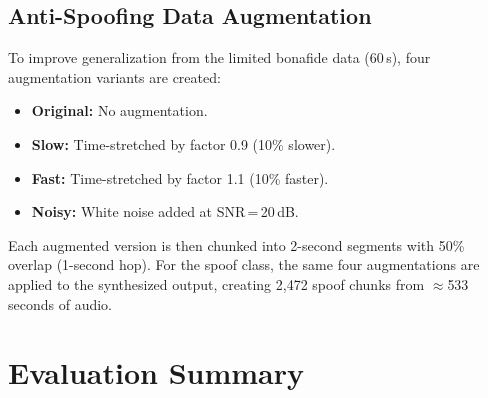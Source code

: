 \documentclass[11pt]{article}
\begin{document}
\subsection{Anti-Spoofing Data Augmentation}

To improve generalization from the limited bonafide data (60\,s), four
augmentation variants are created:
\begin{itemize}
  \item \textbf{Original:} No augmentation.
  \item \textbf{Slow:} Time-stretched by factor 0.9 (10\% slower).
  \item \textbf{Fast:} Time-stretched by factor 1.1 (10\% faster).
  \item \textbf{Noisy:} White noise added at SNR\,=\,20\,dB.
\end{itemize}
Each augmented version is then chunked into 2-second segments with 50\%
overlap (1-second hop). For the spoof class, the same four augmentations
are applied to the synthesized output, creating 2,472 spoof chunks from
$\approx$533 seconds of audio.


\section{Evaluation Summary}
\end{document}
